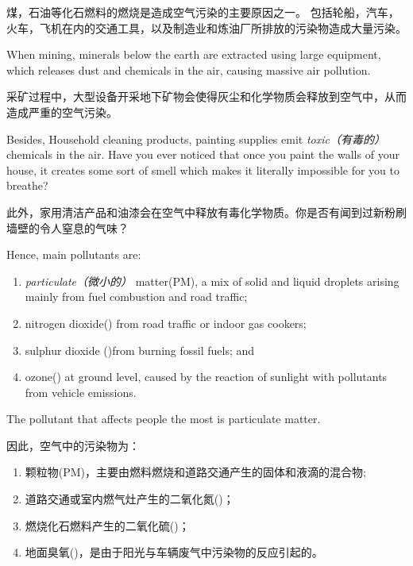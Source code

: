 \begin{multicols}{3}
煤，石油等化石燃料的燃烧是造成空气污染的主要原因之一。 包括轮船，汽车，火车，飞机在内的交通工具，以及制造业和炼油厂所排放的污染物造成大量污染。

When mining, minerals below the earth are extracted using large equipment, which releases dust and chemicals in the air, causing massive air pollution. 

采矿过程中，大型设备开采地下矿物会使得灰尘和化学物质会释放到空气中，从而造成严重的空气污染。

Besides, Household cleaning products, painting supplies emit \textit{toxic（有毒的）} chemicals in the air. Have you ever noticed that once you paint the walls of your house, it creates some sort of smell which makes it literally impossible for you to breathe?

此外，家用清洁产品和油漆会在空气中释放有毒化学物质。你是否有闻到过新粉刷墙壁的令人窒息的气味？

Hence, main pollutants are:
\begin{enumerate}
\item \textit{particulate（微小的）} matter(PM), a mix of solid and liquid droplets arising mainly from fuel combustion and road traffic;

\item nitrogen dioxide() from road traffic or indoor gas cookers; 

\item sulphur dioxide ()from burning fossil fuels; and

\item ozone() at ground level, caused by the reaction of sunlight with pollutants from vehicle emissions. 
\end{enumerate}

The pollutant that affects people the most is particulate matter.

因此，空气中的污染物为：

\begin{enumerate}

\item 颗粒物(PM)，主要由燃料燃烧和道路交通产生的固体和液滴的混合物;

\item 道路交通或室内燃气灶产生的二氧化氮()；

\item 燃烧化石燃料产生的二氧化硫()；

\item 地面臭氧()，是由于阳光与车辆废气中污染物的反应引起的。


\end{enumerate}
\end{multicols}
